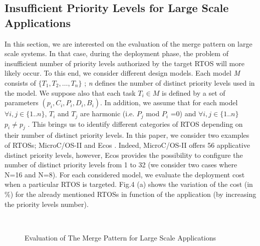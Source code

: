 \documentclass[runningheads,a4paper]{llncs}
\begin{document}
\subsection*{Insufficient Priority Levels for Large Scale Applications} 
In this section, we are interested on the evaluation of the merge pattern on large scale systems. In that case, during the deployment phase, the problem of insufficient number of priority levels authorized by the target RTOS will more likely occur. To this end, we consider different design models. Each model \emph{M} consists of $\{T_1,T_2,…,T_n\}$ ; \emph{n} defines the number of distinct priority levels used in the model. We suppose also that each task $T_i \in M$ is defined by a set of parameters $(p_i,C_i,P_i,D_i,B_i)$. 
In addition, we assume that for each model $\forall i,j \in \{1..n\}$, $T_i$  and $T_j$ are harmonic (i.e. $P_j$ mod $P_i$ =0) and $\forall i,j \in \{1..n\}$ $p_i \ne p_j$ . 
This brings us to identify different categories of RTOS depending on their number of distinct priority levels. In this paper, we consider two examples of RTOSs; MicroC/OS-II \cite{microc} and Ecos \cite{ecos}. Indeed, MicroC/OS-II offers 56 applicative distinct priority levels, however, Ecos provides the possibility to configure the number of distinct priority levels from 1 to 32 (we consider two cases where N=16 and N=8). For each considered model, we evaluate the deployment cost when a particular RTOS is targeted. Fig.4 (a) shows the variation of the cost (in \%) for the already mentioned RTOSs in function of the application (by increasing the priority levels number).  
\begin{figure}[h]
\centering
\mbox
{
\quad
{}
}
\caption{Evaluation of The Merge Pattern for Large Scale Applications}
\end{figure}
\end{document}
